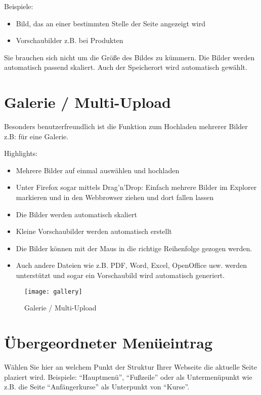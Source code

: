 \documentclass[article, a4paper, oneside, 11pt]{memoir}
\begin{document}
Beispiele:

\begin{itemize}
\item Bild, das an einer bestimmten Stelle der Seite angezeigt wird
\item Vorschaubilder z.B. bei Produkten
\end{itemize}

Sie brauchen sich nicht um die Größe des Bildes zu kümmern. Die Bilder werden automatisch passend skaliert.
Auch der Speicherort wird automatisch gewählt.

\section{Galerie / Multi-Upload}
\label{sec:gallery}

Besonders benutzerfreundlich ist die Funktion zum Hochladen mehrerer Bilder z.B: für eine Galerie.

Highlights:
\begin{itemize}
\item Mehrere Bilder auf einmal auswählen und hochladen
\item Unter Firefox sogar mittels Drag'n'Drop: Einfach mehrere Bilder im Explorer markieren und in den Webbrowser ziehen und dort fallen lassen
\item Die Bilder werden automatisch skaliert
\item Kleine Vorschaubilder werden automatisch erstellt
\item Die Bilder können mit der Maus in die richtige Reihenfolge gezogen werden.
\item Auch andere Dateien wie z.B. PDF, Word, Excel, OpenOffice usw. werden unterstützt und sogar ein Vorschaubild wird automatisch generiert.
\end{itemize}


\begin{figure}[htp]
\centering
\texttt{[image: gallery]}
\caption{Galerie / Multi-Upload}
\label{fig:gallery}
\end{figure}






\section{Übergeordneter Menüeintrag}

Wählen Sie hier an welchem Punkt der Struktur Ihrer Webseite die aktuelle Seite plaziert wird. Beispiele: "`Hauptmenü"', "`Fußzeile"' oder als Untermenüpunkt wie z.B. die Seite "`Anfängerkurse"' als Unterpunkt von "`Kurse"'.
\end{document}
